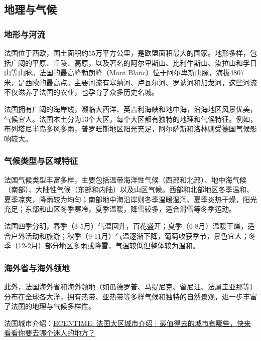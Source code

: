 \subsection{地理与气候}

\subsubsection{地形与河流}

法国位于西欧，国土面积约55万平方公里，是欧盟面积最大的国家。地形多样，包括广阔的平原、丘陵、高原，以及著名的阿尔卑斯山、比利牛斯山、汝拉山和孚日山等山脉。法国的最高峰勃朗峰（Mont Blanc）位于阿尔卑斯山脉，海拔4807米，是西欧的最高点。主要河流有塞纳河、卢瓦尔河、罗讷河和加龙河，这些河流不仅滋养了法国的农业，也孕育了众多历史名城。

法国拥有广阔的海岸线，濒临大西洋、英吉利海峡和地中海，沿海地区风景优美，气候宜人。法国本土分为13个大区，每个大区都有独特的地理和气候特征。例如，布列塔尼半岛多风多雨，普罗旺斯地区阳光充足，阿尔萨斯和洛林则受德国气候影响较大。

\subsubsection{气候类型与区域特征}

法国气候类型丰富多样，主要包括温带海洋性气候（西部和北部）、地中海气候（南部）、大陆性气候（东部和内陆）以及山区气候。西部和北部地区冬季温和、夏季凉爽，降雨较为均匀；南部地中海沿岸则冬季温暖湿润、夏季炎热干燥，阳光充足；东部和山区冬季寒冷，夏季温暖，降雪较多，适合滑雪等冬季运动。

法国四季分明，春季（3-5月）气温回升，百花盛开；夏季（6-8月）温暖干燥，适合户外活动和旅游；秋季（9-11月）气温逐渐下降，葡萄收获季节，景色宜人；冬季（12-2月）部分地区多雨或降雪，气温较低但整体较为温和。

\subsubsection{海外省与海外领地}

此外，法国海外省和海外领地（如瓜德罗普、马提尼克、留尼汪、法属圭亚那等）分布在全球各大洋，拥有热带、亚热带等多样气候和独特的自然景观，进一步丰富了法国的地理与气候多样性。

法国城市介绍：\href{https://www.ecentime.com/article/-france-geographie}{ECENTIME: 法国大区城市介绍｜最值得去的城市有哪些，快来看看你要去哪个迷人的地方？}
